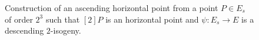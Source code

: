 \documentclass[10pt,a4paper]{beamer}
\theoremstyle{plain}
\theoremstyle{definition}
\theoremstyle{definition}
\theoremstyle{definition}
\theoremstyle{definition}
\theoremstyle{remark}
\theoremstyle{remark}
\begin{document}
\begin{frame}
\begin{figure}
\begin{center}
\begin{tikzpicture}[scale=0.50]
\end{tikzpicture}
\end{center}
\caption{ Construction of an ascending horizontal point from a point $P \in 
E_s$ of order $2^3$ such that $[2]P$ is an horizontal point and $\psi: E_s 
\rightarrow E$ is a descending $2$-isogeny.} 
\end{figure}
\end{frame}
\end{document}
